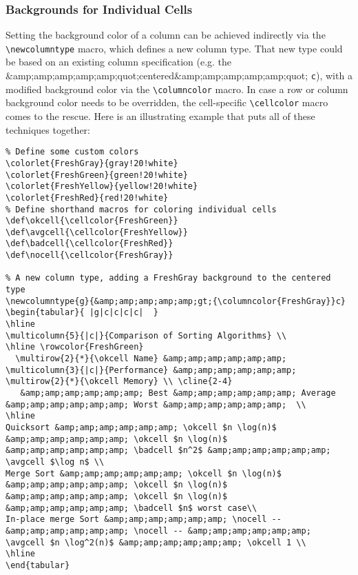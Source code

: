 \subsubsection{Backgrounds for Individual Cells}

Setting the background color of a column can be achieved indirectly via the \verb|\newcolumntype| macro, which defines a new column type. That new type could be based on an existing column specification (e.g. the &amp;amp;amp;amp;amp;quot;centered&amp;amp;amp;amp;amp;quot; \verb|c|), with a modified background color via the \verb|\columncolor| macro. In case a row or column background color needs to be overridden, the cell-specific \verb|\cellcolor| macro comes to the rescue. Here is an illustrating example that puts all of these techniques together:

\begin{lstlisting}
% Define some custom colors
\colorlet{FreshGray}{gray!20!white}
\colorlet{FreshGreen}{green!20!white}
\colorlet{FreshYellow}{yellow!20!white}
\colorlet{FreshRed}{red!20!white}
% Define shorthand macros for coloring individual cells
\def\okcell{\cellcolor{FreshGreen}}
\def\avgcell{\cellcolor{FreshYellow}}
\def\badcell{\cellcolor{FreshRed}}
\def\nocell{\cellcolor{FreshGray}}

% A new column type, adding a FreshGray background to the centered type
\newcolumntype{g}{&amp;amp;amp;amp;amp;gt;{\columncolor{FreshGray}}c}
\begin{tabular}{ |g|c|c|c|c|  }
\hline
\multicolumn{5}{|c|}{Comparison of Sorting Algorithms} \\
\hline \rowcolor{FreshGreen} 
  \multirow{2}{*}{\okcell Name} &amp;amp;amp;amp;amp;amp; \multicolumn{3}{|c|}{Performance} &amp;amp;amp;amp;amp;amp; \multirow{2}{*}{\okcell Memory} \\ \cline{2-4}
   &amp;amp;amp;amp;amp;amp; Best &amp;amp;amp;amp;amp;amp; Average &amp;amp;amp;amp;amp;amp; Worst &amp;amp;amp;amp;amp;amp;  \\
\hline
Quicksort &amp;amp;amp;amp;amp;amp; \okcell $n \log(n)$ &amp;amp;amp;amp;amp;amp; \okcell $n \log(n)$ &amp;amp;amp;amp;amp;amp; \badcell $n^2$ &amp;amp;amp;amp;amp;amp; \avgcell $\log n$ \\
Merge Sort &amp;amp;amp;amp;amp;amp; \okcell $n \log(n)$ &amp;amp;amp;amp;amp;amp; \okcell $n \log(n)$ &amp;amp;amp;amp;amp;amp; \okcell $n \log(n)$ &amp;amp;amp;amp;amp;amp; \badcell $n$ worst case\\
In-place merge Sort &amp;amp;amp;amp;amp;amp; \nocell -- &amp;amp;amp;amp;amp;amp; \nocell -- &amp;amp;amp;amp;amp;amp; \avgcell $n \log^2(n)$ &amp;amp;amp;amp;amp;amp; \okcell 1 \\
\hline
\end{tabular}
\end{lstlisting}

